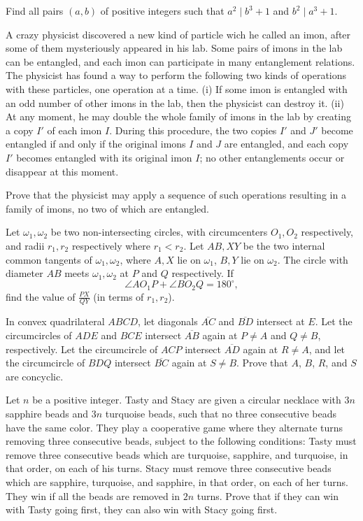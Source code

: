 \documentclass[11pt]{scrartcl}
\begin{document}
\begin{problem}[685299549954467]
Find all pairs $(a,b)$ of positive integers such that $a^2\mid b^3+1$ and $b^2\mid a^3+1$.
\end{problem}
\begin{problem}[685485832068823]
	A crazy physicist discovered a new kind of particle wich he called an imon, after some of them mysteriously appeared in his lab. Some pairs of imons in the lab can be entangled, and each imon can participate in many entanglement relations. The physicist has found a way to perform the following two kinds of operations with these particles, one operation at a time.
(i) If some imon is entangled with an odd number of other imons in the lab, then the physicist can destroy it.
(ii) At any moment, he may double the whole family of imons in the lab by creating a copy $I'$ of each imon $I$. During this procedure, the two copies $I'$ and $J'$ become entangled if and only if the original imons $I$ and $J$ are entangled, and each copy $I'$ becomes entangled with its original imon $I$; no other entanglements occur or disappear at this moment.

Prove that the physicist may apply a sequence of such operations resulting in a family of imons, no two of which are entangled.
\end{problem}
\begin{problem}[689874125173032]
Let $\omega_1,\omega_2$ be two non-intersecting circles, with circumcenters $O_1,O_2$ respectively, and radii $r_1,r_2$ respectively where $r_1 < r_2$. Let $AB,XY$ be the two internal common tangents of $\omega_1,\omega_2$, where $A,X$ lie on $\omega_1$, $B,Y$ lie on $\omega_2$. The circle with diameter $AB$ meets $\omega_1,\omega_2$ at $P$ and $Q$ respectively. If$$\angle AO_1P+\angle BO_2Q=180^{\circ},$$find the value of $\frac{PX}{QY}$ (in terms of $r_1,r_2$).
\end{problem}
\begin{problem}[689941395946854]
	In convex quadrilateral $ABCD$, let diagonals $\overline{AC}$ and $\overline{BD}$ intersect at $E$. Let the circumcircles of $ADE$ and $BCE$ intersect $\overline{AB}$ again at $P \neq A$ and $Q \neq B$, respectively. Let the circumcircle of $ACP$ intersect $\overline{AD}$ again at $R \neq A$, and let the circumcircle of $BDQ$ intersect $\overline{BC}$ again at $S \neq B$. Prove that $A$, $B$, $R$, and $S$ are concyclic.
\end{problem}
\begin{problem}[692237787009642]
	Let $n$ be a positive integer. Tasty and Stacy are given a circular necklace with $3n$ sapphire beads and $3n$ turquoise beads, such that no three consecutive beads have the same color. They play a cooperative game where they alternate turns removing three consecutive beads, subject to the following conditions:
Tasty must remove three consecutive beads which are turquoise, sapphire, and turquoise, in that order, on each of his turns.
Stacy must remove three consecutive beads which are sapphire, turquoise, and sapphire, in that order, on each of her turns.
They win if all the beads are removed in $2n$ turns. Prove that if they can win with Tasty going first, they can also win with Stacy going first.
\end{problem}
\end{document}
